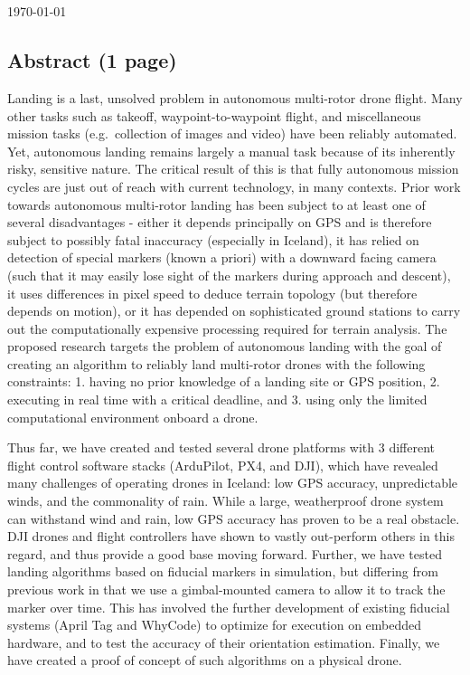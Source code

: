 \begin{center}
    \Large
    \textbf{\documenttitle}
    ~\\[0.5cm]
    \documentauthor
    ~\\[0.5cm]
    \specialdate\today
\end{center}

\subsection*{Abstract (1 page)}

Landing is a last, unsolved problem in autonomous multi-rotor drone flight.
Many other tasks such as takeoff, waypoint-to-waypoint flight,
and miscellaneous mission tasks (e.g.~collection of images and video) have been reliably automated.
Yet, autonomous landing remains largely a manual task because of its inherently risky, sensitive nature.
The critical result of this is that fully autonomous mission cycles are just out of reach with current technology, in many contexts.
Prior work towards autonomous multi-rotor landing has been subject to at least one of several disadvantages -
either it depends principally on GPS and is therefore subject to possibly fatal inaccuracy (especially in Iceland),
it has relied on detection of special markers (known a priori) with a downward facing camera (such that it may easily lose sight of the markers during approach and descent),
it uses differences in pixel speed to deduce terrain topology (but therefore depends on motion),
or it has depended on sophisticated ground stations to carry out the computationally expensive processing required for terrain analysis.
The proposed research targets the problem of autonomous landing
with the goal of creating an algorithm to reliably land multi-rotor drones
with the following constraints:
1. having no prior knowledge of a landing site or GPS position,
2. executing in real time with a critical deadline, and
3. using only the limited computational environment onboard a drone.

Thus far, we have created and tested several drone platforms with 3 different flight control software stacks (ArduPilot, PX4, and DJI),
which have revealed many challenges of operating drones in Iceland: low GPS accuracy, unpredictable winds, and the commonality of rain.
While a large, weatherproof drone system can withstand wind and rain, low GPS accuracy has proven to be a real obstacle.
DJI drones and flight controllers have shown to vastly out-perform others in this regard, and thus provide a good base moving forward.
Further, we have tested landing algorithms based on fiducial markers in simulation,
but differing from previous work in that we use a gimbal-mounted camera to allow it to track the marker over time.
This has involved the further development of existing fiducial systems (April Tag and WhyCode) to optimize for execution on embedded hardware,
and to test the accuracy of their orientation estimation.
Finally, we have created a proof of concept of such algorithms on a physical drone.

